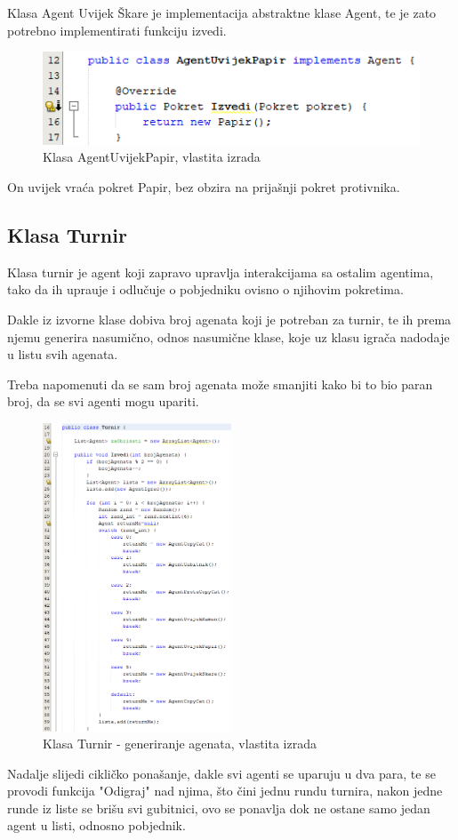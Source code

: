 \documentclass{foi}
\begin{document}
Klasa Agent Uvijek Škare je implementacija abstraktne klase Agent, te je zato potrebno implementirati funkciju izvedi.

\begin{figure}[h!]
    \centering
    \includegraphics[scale=0.7]{slike/Screenshot_9.png}
    \caption{Klasa AgentUvijekPapir, vlastita izrada}
\end{figure}

On uvijek vraća pokret Papir, bez obzira na prijašnji pokret protivnika.

\clearpage

\subsection{Klasa Turnir}

Klasa turnir je agent koji zapravo upravlja interakcijama sa ostalim agentima, tako da ih uprauje i odlučuje o pobjedniku ovisno o njihovim pokretima.

Dakle iz izvorne klase dobiva broj agenata koji je potreban za turnir, te ih prema njemu generira nasumično, odnos nasumične klase, koje uz klasu igrača nadodaje u listu svih agenata.

Treba napomenuti da se sam broj agenata može smanjiti kako bi to bio paran broj, da se svi agenti mogu upariti.

\begin{figure}[h!]
    \centering
    \includegraphics[width=0.5\textwidth]{slike/Screenshot_14.png}
    \caption{Klasa Turnir - generiranje agenata, vlastita izrada}
\end{figure}
\clearpage
Nadalje slijedi cikličko ponašanje, dakle svi agenti se uparuju u dva para, te se provodi funkcija "Odigraj" nad njima, što čini jednu rundu turnira, nakon jedne runde iz liste se brišu svi gubitnici, ovo se ponavlja dok ne ostane samo jedan agent u listi, odnosno pobjednik.
\end{document}
